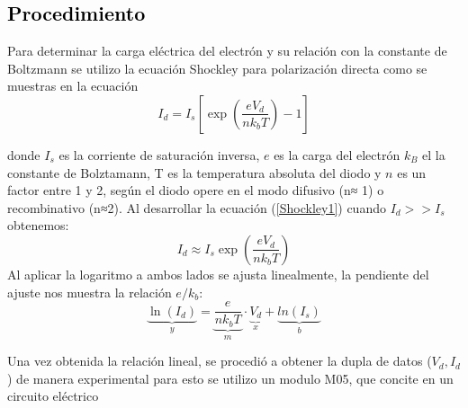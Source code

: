 \textcolor{black}{\section{Procedimiento}}

Para determinar la carga eléctrica del electrón y su relación con la constante de Boltzmann se utilizo la ecuación Shockley para polarización directa como se muestras en la ecuación
\begin{equation}
	I_d = I_s \left[ \exp\left(\frac{eV_d}{nk_b T}\right) - 1 \right]
	\label{Shockley1}
\end{equation}

donde $I_s$ es la corriente de saturación inversa, $e$ es la carga del electrón $k_B$ el la constante de Bolztamann, T es la temperatura absoluta del diodo y $n$ es un factor entre 1 y 2, según el diodo 
opere en el modo difusivo (n≈ 1) o recombinativo (n≈2). Al desarrollar la  ecuación (\ref{Shockley1}) cuando $I_d >> I_s$ obtenemos:
\begin{equation}
    I_d \approx I_s \exp\left(\frac{eV_d}{nk_b T}\right)
    \label{shock2}
\end{equation}
Al aplicar la logaritmo a ambos lados se ajusta linealmente, la pendiente del ajuste nos muestra la relación $e/k_b$:
\begin{equation}
	\underbrace{\ln(I_d)}_{y} = \underbrace{\frac{e}{nk_b T}}_{m} \cdot \underbrace{V_d}_{x}  + \underbrace{ln(I_s)}_{b}
\end{equation}

Una vez obtenida la relación lineal, se procedió a obtener la dupla de datos ($V_d, I_d$) de manera experimental para esto se utilizo un modulo M05, que concite en un circuito eléctrico 